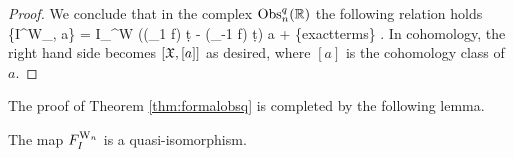 \begin{proof}
We conclude that in the complex ${\rm Obs}^q_n(\mathbb R)$ the following relation holds
\ben
\hbar \{I^{\rm W}_\fX , a\} = I_\fX^{\rm W} ((\tau_{1} f) \d t - (\tau_{-1} f) \d t) \cdot
a + \{{\rm exact\;terms}\} .
\een
In cohomology, the right hand side becomes $[\mathfrak X, [a] ]$ as desired,
where $[a]$ is the cohomology class of $a$. 
\end{proof}






The proof of Theorem \ref{thm:formalobsq} is completed by the following lemma.

\begin{lem}
The map $F_I^{{{\rm W}_n}}$ is a quasi-isomorphism.
\end{lem}